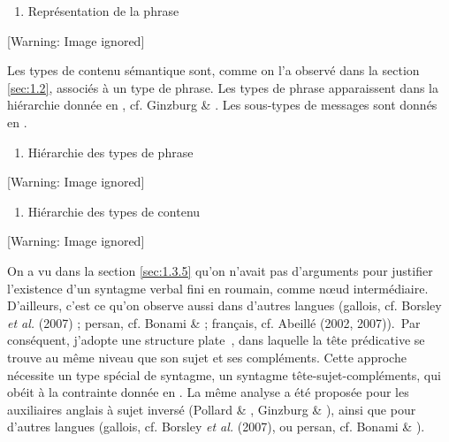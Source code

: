 \begin{enumerate}
\item Représentation de la phrase


\end{enumerate}
  [Warning: Image ignored] %
 

Les types de contenu sémantique sont, comme on l'a observé dans la section \ref{sec:1.2}, associés à un type de phrase. Les types de phrase apparaissent dans la hiérarchie donnée en , cf. Ginzburg \& \citet{Sag2000}. Les sous-types de messages sont donnés en .


\begin{enumerate}
\item \label{bkm:Ref299380534}Hiérarchie des types de phrase 


\end{enumerate}
{   [Warning: Image ignored] %
} 


\begin{enumerate}
\item \label{bkm:Ref299381388}Hiérarchie des types de contenu


\end{enumerate}
{   [Warning: Image ignored] %
} 

On a vu dans la section \ref{sec:1.3.5} qu'on n'avait pas d'arguments pour justifier l'existence d'un syntagme verbal fini en roumain, comme n{\oe}ud intermédiaire. D'ailleurs, c'est ce qu'on observe aussi dans d'autres langues (gallois, cf. Borsley \textit{et al.} (2007) ; persan, cf. Bonami \& \citet{Samvelian2009} ; français, cf. Abeillé (2002, 2007)).~Par conséquent, j'adopte une structure {\guillemotleft} plate~{\guillemotright}, dans laquelle la tête prédicative se trouve au même niveau que son sujet et ses compléments. Cette approche nécessite un type spécial de syntagme, un syntagme tête-sujet-compléments, qui obéit à la contrainte donnée en . La même analyse a été proposée pour les auxiliaires anglais à sujet inversé (Pollard \& \citet{Sag1994}, Ginzburg \& \citet{Sag2000}), ainsi que pour d'autres langues (gallois, cf. Borsley \textit{et al.} (2007), ou persan, cf. Bonami \& \citet{Samvelian2009}).  


